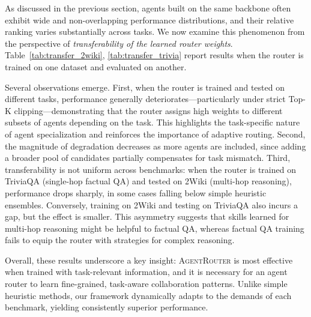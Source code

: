 \documentclass[11pt]{article}
\begin{document}
As discussed in the previous section, agents built on the same backbone often exhibit wide and non-overlapping performance distributions, and their relative ranking varies substantially across tasks. We now examine this phenomenon from the perspective of \emph{transferability of the learned router weights}. Table~\ref{tab:transfer_2wiki}, \ref{tab:transfer_trivia} report results when the router is trained on one dataset and evaluated on another.

Several observations emerge. First, when the router is trained and tested on different tasks, performance generally deteriorates—particularly under strict Top-K clipping—demonstrating that the router assigns high weights to different subsets of agents depending on the task. This highlights the task-specific nature of agent specialization and reinforces the importance of adaptive routing. Second, the magnitude of degradation decreases as more agents are included, since adding a broader pool of candidates partially compensates for task mismatch. Third, transferability is not uniform across benchmarks: when the router is trained on TriviaQA (single-hop factual QA) and tested on 2Wiki (multi-hop reasoning), performance drops sharply, in some cases falling below simple heuristic ensembles. Conversely, training on 2Wiki and testing on TriviaQA also incurs a gap, but the effect is smaller. This asymmetry suggests that skills learned for multi-hop reasoning might be helpful to factual QA, whereas factual QA training fails to equip the router with strategies for complex reasoning.

Overall, these results underscore a key insight: \textsc{AgentRouter} is most effective when trained with task-relevant information, and it is necessary for an agent router to learn fine-grained, task-aware collaboration patterns. Unlike simple heuristic methods, our framework dynamically adapts to the demands of each benchmark, yielding consistently superior performance.  
\end{document}
